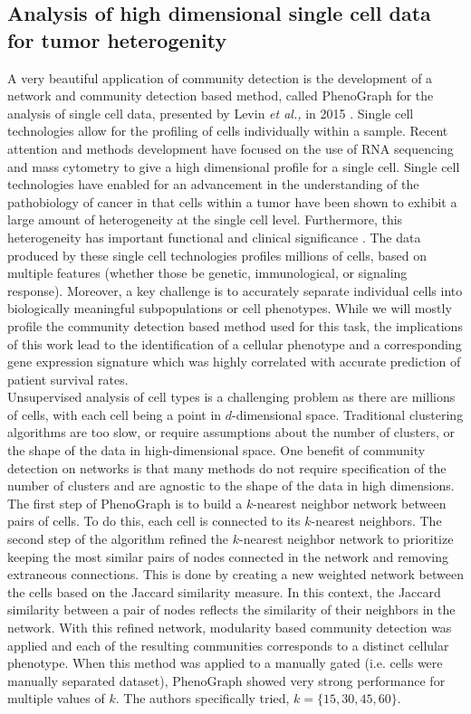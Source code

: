 \subsection{Analysis of high dimensional single cell data for tumor heterogenity}
\indent A very beautiful application of community detection is the development of a network and community detection based method, called PhenoGraph for the analysis of single cell data, presented by Levin \emph{et al.,} in 2015 \cite{phenoGraph}. Single cell technologies allow for the profiling of cells individually within a sample. Recent attention and methods development have focused on the use of RNA sequencing and mass cytometry to give a high dimensional profile for a single cell. Single cell technologies have enabled for an advancement in the understanding of the pathobiology of cancer in that cells within a tumor have been shown to exhibit a large amount of heterogeneity at the single cell level. Furthermore, this heterogeneity has important functional and clinical significance \cite{intraTumor}. The data produced by these single cell technologies profiles millions of cells, based on multiple features (whether those be genetic, immunological, or signaling response). Moreover, a key challenge is to accurately separate individual cells into biologically meaningful subpopulations or cell phenotypes. While we will mostly profile the community detection based method used for this task, the implications of this work lead to the identification of a cellular phenotype and a corresponding gene expression signature which was highly correlated with accurate prediction of patient survival rates. \\
\indent Unsupervised analysis of cell types is a challenging problem as there are millions of cells, with each cell being a point in $d$-dimensional space. Traditional clustering algorithms are too slow, or require assumptions about the number of clusters, or the shape of the data in high-dimensional space. One benefit of community detection on networks is that many methods do not require specification of the number of clusters and are agnostic to the shape of the data in high dimensions. The first step of PhenoGraph is to build a $k$-nearest neighbor network between pairs of cells. To do this, each cell is connected to its $k$-nearest neighbors. The second step of the algorithm refined the $k$-nearest neighbor network to prioritize keeping the most similar pairs of nodes connected in the network and removing extraneous connections. This is done by creating a new weighted network between the cells based on the Jaccard similarity measure. In this context, the Jaccard similarity between a pair of nodes reflects the similarity of their neighbors in the network. With this refined network, modularity based community detection was applied and each of the resulting communities corresponds to a distinct cellular phenotype. When this method was applied to a manually gated (i.e. cells were manually separated dataset),  PhenoGraph showed very strong performance for multiple values of $k$. The authors specifically tried, $k=\{15,30,45,60\}$. 
